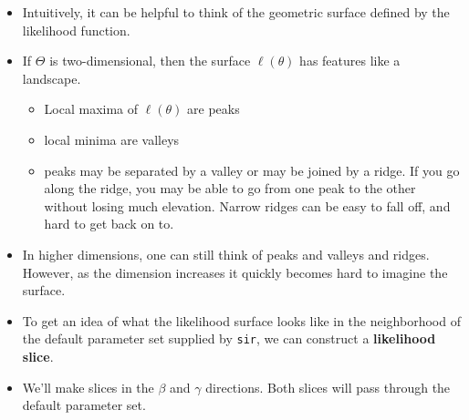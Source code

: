 \documentclass[]{article}
\begin{document}
\begin{itemize}
\item
  Intuitively, it can be helpful to think of the geometric surface
  defined by the likelihood function.
\item
  If \(\Theta\) is two-dimensional, then the surface \(\ell(\theta)\)
  has features like a landscape.

  \begin{itemize}
  \item
    Local maxima of \(\ell(\theta)\) are peaks
  \item
    local minima are valleys
  \item
    peaks may be separated by a valley or may be joined by a ridge. If
    you go along the ridge, you may be able to go from one peak to the
    other without losing much elevation. Narrow ridges can be easy to
    fall off, and hard to get back on to.
  \end{itemize}
\item
  In higher dimensions, one can still think of peaks and valleys and
  ridges. However, as the dimension increases it quickly becomes hard to
  imagine the surface.
\item
  To get an idea of what the likelihood surface looks like in the
  neighborhood of the default parameter set supplied by \texttt{sir}, we
  can construct a \textbf{likelihood slice}.
\item
  We'll make slices in the \(\beta\) and \(\gamma\) directions. Both
  slices will pass through the default parameter set.
\end{itemize}
\end{document}
